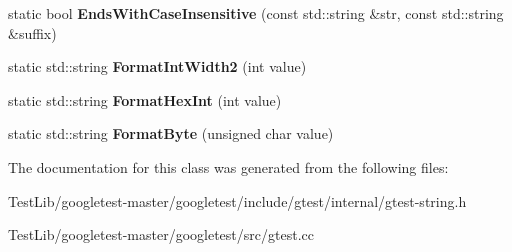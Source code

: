\begin{DoxyCompactItemize}
\mbox{\label{classtesting_1_1internal_1_1String_a968f242b709f8c7c0ed5ecf246553321}} 
static bool {\bfseries Ends\+With\+Case\+Insensitive} (const std\+::string \&str, const std\+::string \&suffix)
\item 
\mbox{\label{classtesting_1_1internal_1_1String_af50b18d588355871e1982c4043523e0f}} 
static std\+::string {\bfseries Format\+Int\+Width2} (int value)
\item 
\mbox{\label{classtesting_1_1internal_1_1String_affe59102e49092fc0684388e9b0c5c1e}} 
static std\+::string {\bfseries Format\+Hex\+Int} (int value)
\item 
\mbox{\label{classtesting_1_1internal_1_1String_af702dc7cbd569589d8e3ff215a7cafa9}} 
static std\+::string {\bfseries Format\+Byte} (unsigned char value)
\end{DoxyCompactItemize}


The documentation for this class was generated from the following files\+:\begin{DoxyCompactItemize}
\item 
Test\+Lib/googletest-\/master/googletest/include/gtest/internal/gtest-\/string.\+h\item 
Test\+Lib/googletest-\/master/googletest/src/gtest.\+cc\end{DoxyCompactItemize}

